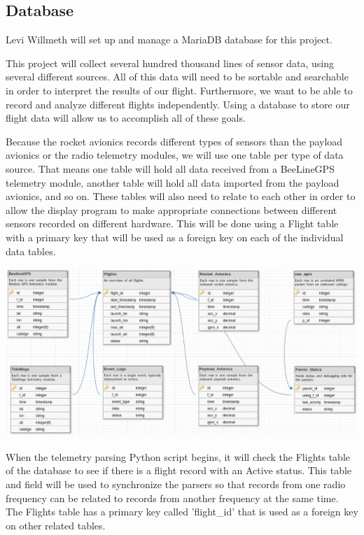 \documentclass[onecolumn, draftclsnofoot, 10pt, compsoc]{IEEEtran}
\begin{document}
\subsection{Database}
\label{subsec:database}

Levi Willmeth will set up and manage a MariaDB database for this project.

This project will collect several hundred thousand lines of sensor data, using several different sources.  All of this data will need to be sortable and searchable in order to interpret the results of our flight.  Furthermore, we want to be able to record and analyze different flights independently.  Using a database to store our flight data will allow us to accomplish all of these goals.

Because the rocket avionics records different types of sensors than the payload avionics or the radio telemetry modules, we will use one table per type of data source.  That means one table will hold all data received from a BeeLineGPS telemetry module, another table will hold all data imported from the payload avionics, and so on.  These tables will also need to relate to each other in order to allow the display program to make appropriate connections between different sensors recorded on different hardware.  This will be done using a Flight table with a primary key that will be used as a foreign key on each of the individual data tables.

\begin{center}
	\includegraphics[width=\textwidth]{images/database_schema_v102.eps}
    \label{database-schema}
\end{center}

When the telemetry parsing Python script begins, it will check the Flights table of the database to see if there is a flight record with an Active status.  This table and field will be used to synchronize the parsers so that records from one radio frequency can be related to records from another frequency at the same time.  The Flights table has a primary key called 'flight\_id' that is used as a foreign key on other related tables.
\end{document}
